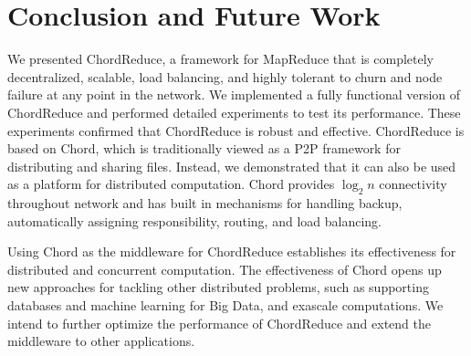 




\section{Conclusion and Future Work}



We presented ChordReduce, a framework for MapReduce that is completely decentralized, scalable, load balancing, and highly tolerant to churn and node failure at any point in the network. We implemented a fully functional version of ChordReduce and performed detailed experiments to test its performance. These experiments confirmed that ChordReduce is robust and effective. ChordReduce is based on Chord, which is traditionally viewed as a P2P framework for distributing and sharing files.  Instead, we demonstrated that it can also be used as a platform for distributed computation.  Chord provides $\log_{2} n$ connectivity throughout network and has built in mechanisms for handling backup, automatically assigning responsibility, routing, and load balancing. 


Using Chord as the middleware for ChordReduce establishes its effectiveness for distributed and concurrent computation.
The effectiveness of Chord opens up new approaches for tackling other distributed problems, such as supporting databases and machine learning for Big Data, and exascale computations. We intend to further optimize the performance of ChordReduce and extend the middleware to other applications.


